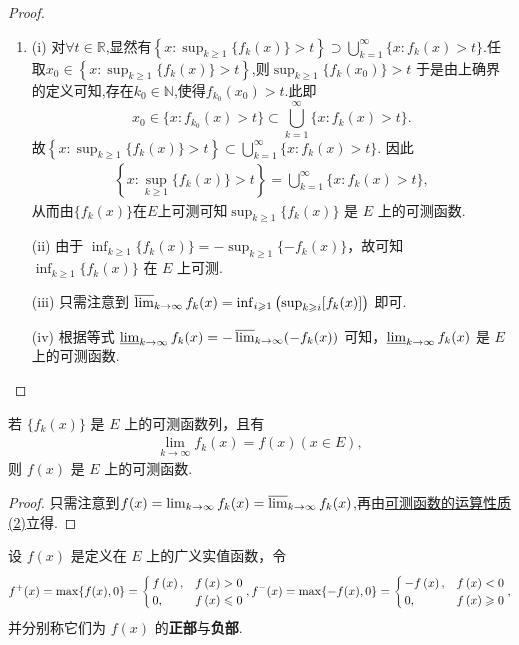 \documentclass[../../main.tex]{subfiles}%
\begin{document}
\begin{proof}
\begin{enumerate}[(1)]
\item (i) 对$\forall t \in \mathbb{R}$,显然有$\left\{x: \sup_{k \geqslant 1}\{f_k(x)\} > t\right\} \supset \bigcup_{k = 1}^{\infty}\{x: f_k(x) > t\}.$任取$x_0\in \left\{x: \sup_{k \geqslant 1}\{f_k(x)\} > t\right\}$,则$ \sup_{k \geqslant 1}\{f_k(x_0)\} > t$
于是由上确界的定义可知,存在$k_0\in \mathbb{N}$,使得$f_{k_0}(x_0)>t$.此即$$x_0\in \{x: f_{k_0}(x) > t\}\subset \bigcup_{k = 1}^{\infty}\{x: f_k(x) > t\}.$$
故$\left\{x: \sup_{k \geqslant 1}\{f_k(x)\} > t\right\} \subset \bigcup_{k = 1}^{\infty}\{x: f_k(x) > t\}.$
因此
\begin{align*}
\left\{x: \sup_{k \geqslant 1}\{f_k(x)\} > t\right\} = \bigcup_{k = 1}^{\infty}\{x: f_k(x) > t\},
\end{align*}
从而由$\{f_k(x)\}$在$E$上可测可知\(\sup_{k \geqslant 1}\{f_k(x)\}\) 是 \(E\) 上的可测函数.

(ii) 由于 \(\inf_{k \geqslant 1}\{f_k(x)\} = -\sup_{k \geqslant 1}\{-f_k(x)\}\)，故可知 \(\inf_{k \geqslant 1}\{f_k(x)\}\) 在 \(E\) 上可测.

(iii) 只需注意到 \(\varlimsup_{k \to \infty} f_k(x) = \inf_{i \geqslant 1}\left(\sup_{k \geqslant i}[f_k(x)]\right)\) 即可.

(iv) 根据等式 \(\varliminf_{k \to \infty} f_k(x) = -\varlimsup_{k \to \infty}(-f_k(x))\) 可知，\(\varliminf_{k \to \infty} f_k(x)\) 是 \(E\) 上的可测函数. 
\end{enumerate}

\end{proof}

\begin{corollary}\label{corollary:可测函数列的极限也可测}
若 \(\{f_k(x)\}\) 是 \(E\) 上的可测函数列，且有
\begin{align*}
\lim_{k \to \infty}f_k(x) = f(x) (x \in E),
\end{align*}
则 \(f(x)\) 是 \(E\) 上的可测函数. 
\end{corollary}
\begin{proof}

只需注意到$f(x)=\lim_{k\to \infty}f_k(x)=\varlimsup_{k\to \infty}f_k(x)$,再由\hyperref[theorem:可测函数的运算性质]{可测函数的运算性质(2)}立得.

\end{proof}

\begin{definition}[函数的正部和负部]
设 \(f(x)\) 是定义在 \(E\) 上的广义实值函数，令
\[
f^+(x)=\max \{f(x),0\}=\begin{cases}
f\left( x \right) ,&f\left( x \right) >0\\
0,&f\left( x \right) \leqslant 0\\
\end{cases},
\\
f^-(x)=\max \{-f(x),0\}=\begin{cases}
-f\left( x \right) ,&f\left( x \right) <0\\
0,&f\left( x \right) \geqslant 0\\
\end{cases},
\]
并分别称它们为 \(f(x)\) 的\textbf{正部}与\textbf{负部}.
\end{definition}
\end{document}
